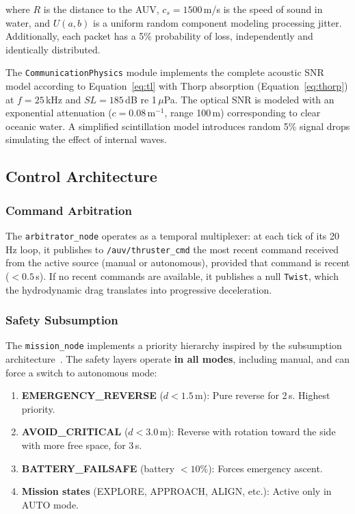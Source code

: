 \documentclass[10pt,twocolumn,letterpaper]{article}
\begin{document}
where $R$ is the distance to the AUV, $c_s = 1500$\,m/s is the speed of sound in water, and $U(a,b)$ is a uniform random component modeling processing jitter. Additionally, each packet has a 5\% probability of loss, independently and identically distributed.

The \texttt{CommunicationPhysics} module implements the complete acoustic SNR model according to Equation~\ref{eq:tl} with Thorp absorption (Equation~\ref{eq:thorp}) at $f = 25$\,kHz and $SL = 185$\,dB re 1\,$\mu$Pa. The optical SNR is modeled with an exponential attenuation ($c = 0.08$\,m$^{-1}$, range 100\,m) corresponding to clear oceanic water. A simplified scintillation model introduces random 5\% signal drops simulating the effect of internal waves.

\subsection{Control Architecture}

\subsubsection{Command Arbitration}

The \texttt{arbitrator\_node} operates as a temporal multiplexer: at each tick of its 20\,Hz loop, it publishes to \texttt{/auv/thruster\_cmd} the most recent command received from the active source (manual or autonomous), provided that command is recent ($< 0.5$\,s). If no recent commands are available, it publishes a null \texttt{Twist}, which the hydrodynamic drag translates into progressive deceleration.

\subsubsection{Safety Subsumption}

The \texttt{mission\_node} implements a priority hierarchy inspired by the subsumption architecture~\cite{brooks1986}. The safety layers operate \textbf{in all modes}, including manual, and can force a switch to autonomous mode:

\begin{enumerate}[leftmargin=*,itemsep=2pt]
    \item \textbf{EMERGENCY\_REVERSE} ($d < 1.5$\,m): Pure reverse for 2\,s. Highest priority.
    \item \textbf{AVOID\_CRITICAL} ($d < 3.0$\,m): Reverse with rotation toward the side with more free space, for 3\,s.
    \item \textbf{BATTERY\_FAILSAFE} (battery $< 10\%$): Forces emergency ascent.
    \item \textbf{Mission states} (EXPLORE, APPROACH, ALIGN, etc.): Active only in AUTO mode.
\end{enumerate}
\end{document}
